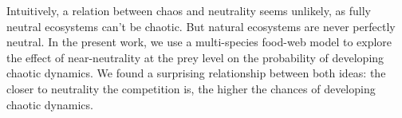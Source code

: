 Intuitively, a relation between chaos and neutrality seems unlikely, as fully neutral ecosystems can't be chaotic. But natural ecosystems are never perfectly neutral. In the present work, we use a multi-species food-web model to explore the effect of near-neutrality at the prey level on the probability of developing chaotic dynamics. We found a surprising relationship between both ideas: the closer to neutrality the competition is, the higher the chances of developing chaotic dynamics.

